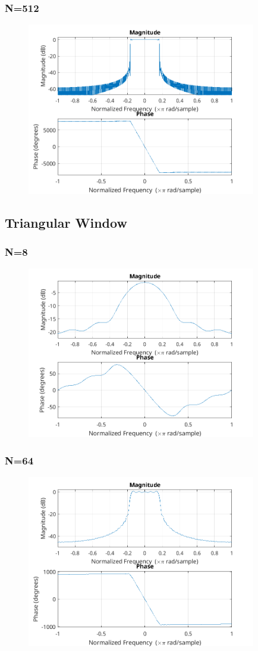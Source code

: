 \documentclass{article}
\begin{document}
  \subsubsection{N=512}
  \begin{figure}[!ht]
  \includegraphics[width=10cm]{freqz_rect_512.png}
  \end{figure}
\subsection{Triangular Window}
  \subsubsection{N=8}
  \begin{figure}[!ht]
  \includegraphics[width=10cm]{freqz_tri_8.png}
  \end{figure}
  \subsubsection{N=64}
  \begin{figure}[!ht]
  \includegraphics[width=10cm]{freqz_tri_64.png}
  \end{figure}
\end{document}
